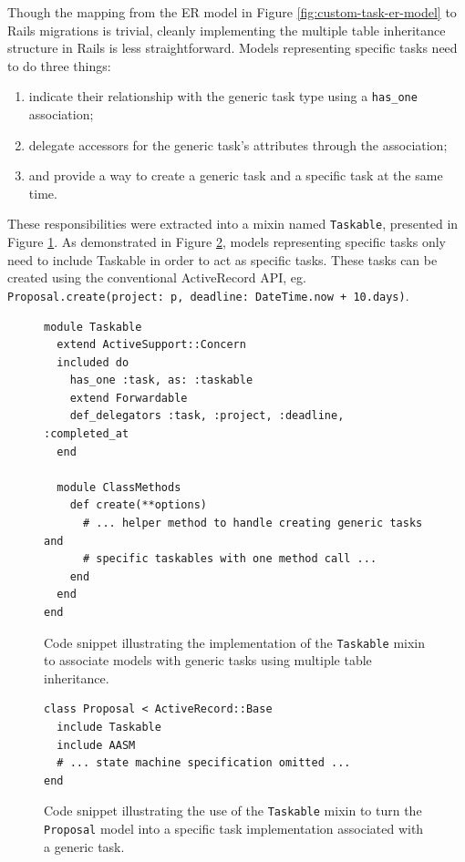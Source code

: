 Though the mapping from the ER model in Figure \ref{fig:custom-task-er-model} to Rails migrations is trivial, cleanly implementing the multiple table inheritance structure in Rails is less straightforward. Models representing specific tasks need to do three things:
\begin{enumerate}
  \item indicate their relationship with the generic task type using a \verb!has_one! association;
  \item delegate accessors for the generic task’s attributes through the association;
  \item and provide a way to create a generic task and a specific task at the same time.
\end{enumerate}

These responsibilities were extracted into a mixin named \verb!Taskable!, presented in Figure \ref{fig:taskable-mixin-definition}. As demonstrated in Figure \ref{fig:taskable-mixin-example}, models representing specific tasks only need to include Taskable in order to act as specific tasks. These tasks can be created using the conventional ActiveRecord API, eg. \\ \verb!Proposal.create(project: p, deadline: DateTime.now + 10.days)!.

\begin{figure}[!ht]
  \begin{lstlisting}
module Taskable
  extend ActiveSupport::Concern
  included do
    has_one :task, as: :taskable
    extend Forwardable
    def_delegators :task, :project, :deadline, :completed_at
  end

  module ClassMethods
    def create(**options)
      # ... helper method to handle creating generic tasks and
      # specific taskables with one method call ...
    end
  end
end
  \end{lstlisting}
  \cprotect\caption{Code snippet illustrating the implementation of the \verb!Taskable! mixin to associate models with generic tasks using multiple table inheritance.}
  \label{fig:taskable-mixin-definition}
\end{figure}

\begin{figure}[!ht]
  \begin{lstlisting}
class Proposal < ActiveRecord::Base
  include Taskable
  include AASM
  # ... state machine specification omitted ...
end
  \end{lstlisting}
  \cprotect\caption{Code snippet illustrating the use of the \verb!Taskable! mixin to turn the \verb!Proposal! model into a specific task implementation associated with a generic task.}
  \label{fig:taskable-mixin-example}
\end{figure}



